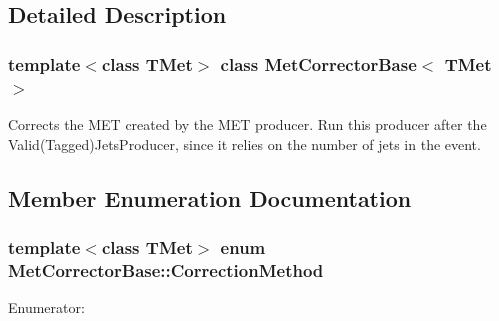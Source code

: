 \subsection{Detailed Description}
\subsubsection*{template$<$class TMet$>$ class MetCorrectorBase$<$ TMet $>$}

Corrects the MET created by the MET producer. Run this producer after the Valid(Tagged)JetsProducer, since it relies on the number of jets in the event. 

\subsection{Member Enumeration Documentation}
\hypertarget{classMetCorrectorBase_a37bb26e946b22f52f1f358c7dd0bedfa}{
\subsubsection[{CorrectionMethod}]{\setlength{\rightskip}{0pt plus 5cm}template$<$class TMet$>$ enum {\bf MetCorrectorBase::CorrectionMethod}}}
\label{classMetCorrectorBase_a37bb26e946b22f52f1f358c7dd0bedfa}
\begin{Desc}
\item[Enumerator: ]\par
\begin{description}
\item[{\em 
\hypertarget{classMetCorrectorBase_a37bb26e946b22f52f1f358c7dd0bedfaac198e6341886c4ae59b4a309a168da33}{
NONE}
\label{classMetCorrectorBase_a37bb26e946b22f52f1f358c7dd0bedfaac198e6341886c4ae59b4a309a168da33}
}]\item[{\em 
\hypertarget{classMetCorrectorBase_a37bb26e946b22f52f1f358c7dd0bedfaaaadedae30db7b716ab6b302d073c30b0}{
QUANTILE\_\-MAPPING}
\label{classMetCorrectorBase_a37bb26e946b22f52f1f358c7dd0bedfaaaadedae30db7b716ab6b302d073c30b0}
}]\item[{\em 
\hypertarget{classMetCorrectorBase_a37bb26e946b22f52f1f358c7dd0bedfaa9f9f7d2ca81e1d7580b61f22ee6fc82b}{
MEAN\_\-RESOLUTION}
\label{classMetCorrectorBase_a37bb26e946b22f52f1f358c7dd0bedfaa9f9f7d2ca81e1d7580b61f22ee6fc82b}
}]\end{description}
\end{Desc}



